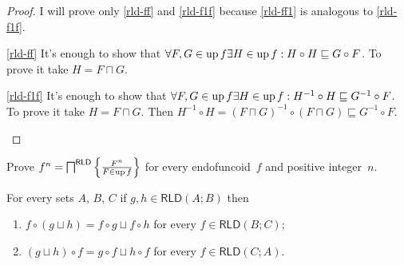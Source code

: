 \begin{proof}
I will prove only \ref{rld-ff} and \ref{rld-f1f} because \ref{rld-ff1}
is analogous to \ref{rld-f1f}.
\begin{widedisorder}
\item [{\ref{rld-ff}}] It's enough to show that $\forall F,G\in\operatorname{up} f\exists H\in\operatorname{up} f:H\circ H\sqsubseteq G\circ F$.
To prove it take $H=F\sqcap G$.
\item [{\ref{rld-f1f}}] It's enough to show that $\forall F,G\in\operatorname{up} f\exists H\in\operatorname{up} f:H^{-1}\circ H\sqsubseteq G^{-1}\circ F$.
To prove it take $H=F\sqcap G$. Then $H^{-1}\circ H=(F\sqcap G)^{-1}\circ(F\sqcap G)\sqsubseteq G^{-1}\circ F$.
\end{widedisorder}
\end{proof}
\begin{xca}\label{rld-fn}
Prove $f^n = \bigsqcap^{\mathsf{RLD}}\left\{ \frac{F^n}{F\in\operatorname{up} f}\right\}$ for every endofuncoid~$f$ and positive integer~$n$.
\end{xca}
\begin{thm}
For every sets $A$, $B$, $C$ if $g,h\in\mathsf{RLD}(A;B)$ then
\begin{enumerate}
\item $f\circ(g\sqcup h)=f\circ g\sqcup f\circ h$ for every $f\in\mathsf{RLD}(B;C)$;
\item $(g\sqcup h)\circ f=g\circ f\sqcup h\circ f$ for every $f\in\mathsf{RLD}(C;A)$.
\end{enumerate}
\end{thm}
